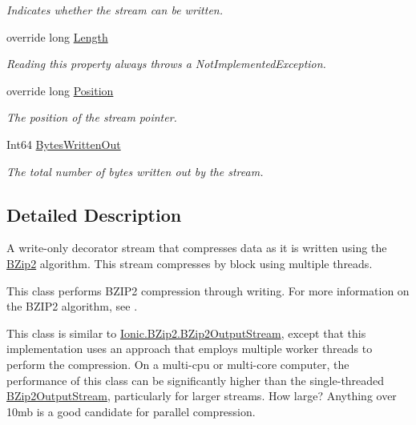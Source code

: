 \begin{DoxyCompactItemize}
\begin{DoxyCompactList}\small\item\em Indicates whether the stream can be written. \end{DoxyCompactList}\item 
override long \mbox{\hyperlink{class_super_tiled2_unity_1_1_ionic_1_1_b_zip2_1_1_parallel_b_zip2_output_stream_a631f45f2aa471093d3fffdb9ffcddd27}{Length}}
\begin{DoxyCompactList}\small\item\em Reading this property always throws a Not\+Implemented\+Exception. \end{DoxyCompactList}\item 
override long \mbox{\hyperlink{class_super_tiled2_unity_1_1_ionic_1_1_b_zip2_1_1_parallel_b_zip2_output_stream_aa760b87a6e97249f9eebbf4fcc23bea9}{Position}}
\begin{DoxyCompactList}\small\item\em The position of the stream pointer. \end{DoxyCompactList}\item 
Int64 \mbox{\hyperlink{class_super_tiled2_unity_1_1_ionic_1_1_b_zip2_1_1_parallel_b_zip2_output_stream_a7bde6bda595b0da9915d0cc7e698b002}{Bytes\+Written\+Out}}
\begin{DoxyCompactList}\small\item\em The total number of bytes written out by the stream. \end{DoxyCompactList}\end{DoxyCompactItemize}


\subsection{Detailed Description}
A write-\/only decorator stream that compresses data as it is written using the \mbox{\hyperlink{namespace_super_tiled2_unity_1_1_ionic_1_1_b_zip2}{B\+Zip2}} algorithm. This stream compresses by block using multiple threads. 

This class performs B\+Z\+I\+P2 compression through writing. For more information on the B\+Z\+I\+P2 algorithm, see . 

This class is similar to \mbox{\hyperlink{class_super_tiled2_unity_1_1_ionic_1_1_b_zip2_1_1_b_zip2_output_stream}{Ionic.\+B\+Zip2.\+B\+Zip2\+Output\+Stream}}, except that this implementation uses an approach that employs multiple worker threads to perform the compression. On a multi-\/cpu or multi-\/core computer, the performance of this class can be significantly higher than the single-\/threaded \mbox{\hyperlink{class_super_tiled2_unity_1_1_ionic_1_1_b_zip2_1_1_b_zip2_output_stream}{B\+Zip2\+Output\+Stream}}, particularly for larger streams. How large? Anything over 10mb is a good candidate for parallel compression. 

